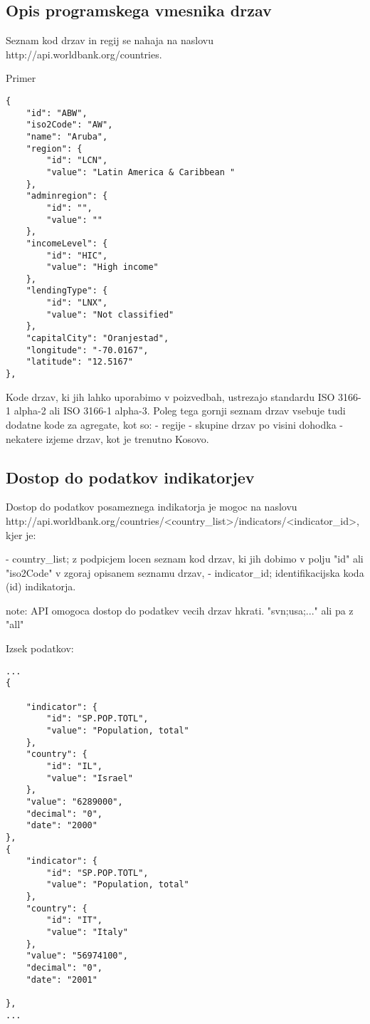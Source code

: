 \subsection{Opis programskega vmesnika drzav}
Seznam kod drzav in regij se nahaja na naslovu 
http://api.worldbank.org/countries.

Primer

\begin{lstlisting}
{
    "id": "ABW",
    "iso2Code": "AW",
    "name": "Aruba",
    "region": {
        "id": "LCN",
        "value": "Latin America & Caribbean "
    },
    "adminregion": {
        "id": "",
        "value": ""
    },
    "incomeLevel": {
        "id": "HIC",
        "value": "High income"
    },
    "lendingType": {
        "id": "LNX",
        "value": "Not classified"
    },
    "capitalCity": "Oranjestad",
    "longitude": "-70.0167",
    "latitude": "12.5167"
},
\end{lstlisting}

Kode drzav, ki jih lahko uporabimo v poizvedbah, ustrezajo standardu ISO 
3166-1  
alpha-2 ali ISO 3166-1 alpha-3.
Poleg tega gornji seznam drzav vsebuje tudi dodatne kode za agregate, kot so:
- regije
- skupine drzav po visini dohodka
- nekatere izjeme drzav, kot je trenutno Kosovo.



\subsection{Dostop do podatkov indikatorjev}
Dostop do podatkov posameznega indikatorja je mogoc na naslovu
http://api.worldbank.org/countries/<country\_list>/indicators/<indicator\_id>,
kjer je:

- country\_list; z podpicjem locen seznam kod drzav, ki jih dobimo v polju "id"
ali "iso2Code" v zgoraj opisanem seznamu drzav,
- indicator\_id; identifikacijska koda (id) indikatorja.


note: API omogoca dostop do podatkev vecih drzav hkrati. "svn;usa;..." ali pa
z "all"



Izsek podatkov:
\begin{lstlisting}
...
{

    "indicator": {
        "id": "SP.POP.TOTL",
        "value": "Population, total"
    },
    "country": {
        "id": "IL",
        "value": "Israel"
    },
    "value": "6289000",
    "decimal": "0",
    "date": "2000"
},
{
    "indicator": {
        "id": "SP.POP.TOTL",
        "value": "Population, total"
    },
    "country": {
        "id": "IT",
        "value": "Italy"
    },
    "value": "56974100",
    "decimal": "0",
    "date": "2001"

},
...
\end{lstlisting}


